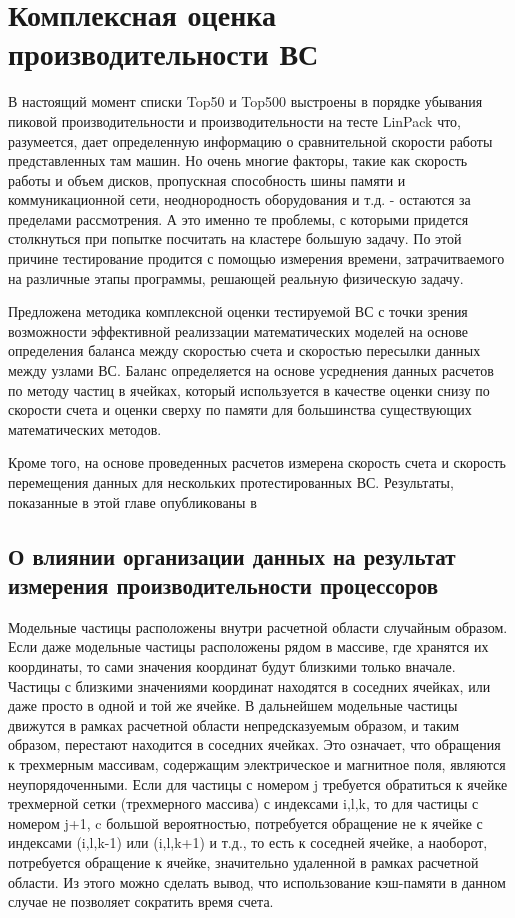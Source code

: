\chapter{Комплексная оценка производительности ВС}



В настоящий момент списки Top50 и Top500
выстроены в порядке убывания пиковой производительности и производительности на тесте LinPack что, разумеется, дает определенную информацию
о сравнительной скорости работы представленных там машин. Но очень многие факторы, такие как скорость работы и объем дисков, пропускная 
способность шины памяти и коммуникационной сети, неоднородность оборудования и т.д. - остаются за пределами рассмотрения. А это именно те 
проблемы, с которыми придется столкнуться при попытке посчитать на кластере большую задачу. По этой причине тестирование продится с помощью измерения времени, затрачитваемого на различные этапы программы, решающей реальную физическую задачу.




Предложена методика комплексной оценки тестируемой ВС с точки зрения возможности эффективной реализзации математических моделей на основе определения баланса между скоростью счета и скоростью пересылки данных между узлами ВС. Баланс определяется на основе усреднения данных расчетов по методу частиц в ячейках, который используется в качестве оценки снизу по скорости счета и оценки сверху по памяти для большинства существующих математических методов.

Кроме того, на основе проведенных расчетов измерена скорость счета и скорость перемещения данных для нескольких протестированных ВС. Результаты, показанные в этой главе опубликованы в \cite{VestnikNNSU,NumMethMultiLevel,SuperFrI,integrApproach}   

		


\section{О влиянии организации данных на результат измерения производительности процессоров}
\label{procs_influence}

Модельные частицы расположены внутри расчетной области случайным образом. Если даже модельные частицы расположены рядом в массиве, где хранятся их координаты,  то сами значения координат будут близкими только вначале. Частицы с близкими значениями координат находятся в соседних ячейках, или даже просто в одной и той же ячейке. В дальнейшем модельные частицы движутся в рамках расчетной области непредсказуемым образом, и таким образом, перестают находится в соседних ячейках. Это означает, что обращения к трехмерным массивам, содержащим электрическое и магнитное поля, являются неупорядоченными. Если для частицы с номером j требуется обратиться к ячейке трехмерной сетки (трехмерного массива) с индексами i,l,k, то для частицы с номером j+1, c большой вероятностью, потребуется обращение не к ячейке с индексами (i,l,k-1) или (i,l,k+1) и т.д., то есть к соседней ячейке, а наоборот, потребуется обращение к ячейке, значительно удаленной в рамках расчетной области. 
Из этого можно сделать вывод, что использование кэш-памяти в данном случае не позволяет сократить время счета. 

